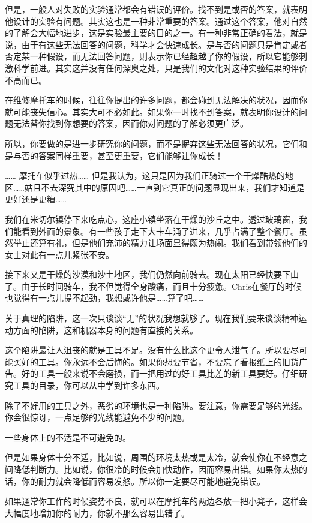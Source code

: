\documentclass[UTF8]{article}
\begin{document}
\par 但是，一般人对失败的实验通常都会有错误的评价。找不到是或否的答案，就表明他设计的实验有问题。其实这也是一种非常重要的答案。通过这个答案，他对自然的了解会大幅地进步，这是实验最主要的目的之一。有一种非常正确的看法，就是说，由于有这些无法回答的问题，科学才会快速成长。是与否的问题只是肯定或者否定某一种假设，而无法回答问题，则表示你已经超越了你的假设，所以它能够刺激科学前进。其实这并没有任何深奥之处，只是我们的文化对这种实验结果的评价不高而已。
\par 在维修摩托车的时候，往往你提出的许多问题，都会碰到无法解决的状况，因而你就可能丧失信心。其实大可不必如此。如果你一时找不到答案，就表明你设计的问题无法替你找到你想要的答案，因而你对问题的了解必须更广泛。
\par 所以，你要做的是进一步研究你的问题，而不是摒弃这些无法回答的状况，它们和是与否的答案同样重要，甚至更重要，它们能够让你成长！
\par …… 摩托车似乎过热…… 但是我认为，这只是因为我们正骑过一个干燥酷热的地区……姑且不去深究其中的原因吧……一直到它真正的问题显现出来，我们才知道是更好还是更糟……
\par 我们在米切尔镇停下来吃点心，这座小镇坐落在干燥的沙丘之中。透过玻璃窗，我们能看到外面的景象。有一些孩子走下大卡车涌了进来，几乎占满了整个餐厅。虽然举止还算有礼，但是他们充沛的精力让场面显得颇为热闹。我们看到带领他们的女士对此有一点儿紧张不安。
\par 接下来又是干燥的沙漠和沙土地区，我们仍然向前骑去。现在太阳已经快要下山了。由于长时间骑车，我不但觉得全身酸痛，而且十分疲惫。Chris在餐厅的时候也觉得有一点儿提不起劲，我想或许他是……算了吧……
\par 关于真理的陷阱，这一次只谈谈“无”的状况我想就够了。现在我们要来谈谈精神运动方面的陷阱，这和机器本身的问题有直接的关系。
\par 这个陷阱最让人沮丧的就是工具不足。没有什么比这个更令人泄气了。所以要尽可能买好的工具。你永远不会后悔的。如果你想要节省，不要忘了看报纸上的旧货广告。好的工具一般来说不会磨损，而一把用过的好工具比差的新工具要好。仔细研究工具的目录，你可以从中学到许多东西。
\par 除了不好用的工具之外，恶劣的环境也是一种陷阱。要注意，你需要足够的光线。你会很惊讶，一点足够的光线能避免不少的问题。
\par 一些身体上的不适是不可避免的。
\par 但是如果身体十分不适，比如说，周围的环境太热或是太冷，就会使你在不经意之间降低判断力。比如说，你很冷的时候会加快动作，因而容易出错。如果你太热的话，你的耐力就会降低而容易发怒。所以你一定要尽可能地避免错误。
\par 如果通常你工作的时候姿势不良，就可以在摩托车的两边各放一把小凳子，这样会大幅度地增加你的耐力，你就不那么容易出错了。
\end{document}
